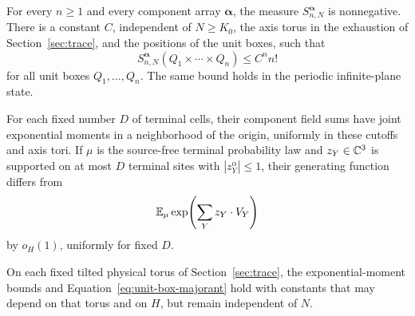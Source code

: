 \begin{proposition}
\label{prop:moment-majorants}
For every $n\ge1$ and every component array $\boldsymbol\alpha$, the
measure $S_{n,N}^{\boldsymbol\alpha}$ is nonnegative.  There is a constant
$C$, independent of $N\ge K_0$, the axis torus in the exhaustion of
Section~\ref{sec:trace}, and the positions of the unit boxes, such that
\begin{equation}
 S_{n,N}^{\boldsymbol\alpha}(Q_1\times\cdots\times Q_n)
       \le C^n n!
 \label{eq:unit-box-majorant}
\end{equation}
for all unit boxes $Q_1,\ldots,Q_n$.  The same bound holds in the
periodic infinite-plane state.

For each fixed number $D$ of terminal cells, their component field sums
have joint exponential moments in a neighborhood of the origin,
uniformly in these cutoffs and axis tori.  If $\mu$ is the source-free
terminal probability law and $z_Y\in\mathbb C^3$ is supported on at most $D$
terminal sites with $|z_Y^\alpha|\le1$, their generating function differs
from
\begin{equation}
             \mathbb E_\mu\exp\!\left(\sum_Y z_Y\cdot V_Y\right)
 \label{eq:orig-34}
\end{equation}
by $o_H(1)$, uniformly for fixed $D$.

On each fixed tilted physical torus of Section~\ref{sec:trace}, the
exponential-moment bounds and Equation~\eqref{eq:unit-box-majorant}
hold with constants that may depend on that torus and on $H$, but remain
independent of $N$.
\end{proposition}

